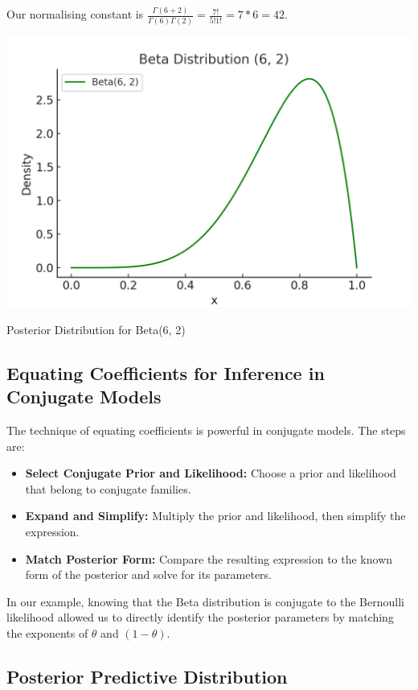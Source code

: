Our normalising constant is $\frac{\Gamma(6+2)}{\Gamma(6)\Gamma(2)} = \frac{7!}{5!1!} = 7*6 = 42$.


\begin{marginfigure}
    \centering
    \includegraphics[width=\linewidth]{img/11_Beta_6_2.png}
    \caption{Posterior Distribution for Beta(6, 2)}
    \label{fig:beta_posterior}
\end{marginfigure}


\subsection{Equating Coefficients for Inference in Conjugate Models}

The technique of equating coefficients is powerful in conjugate models. The steps are:

\begin{itemize}
    \item \textbf{Select Conjugate Prior and Likelihood:} Choose a prior and likelihood that belong to conjugate families.
    \item \textbf{Expand and Simplify:} Multiply the prior and likelihood, then simplify the expression.
    \item \textbf{Match Posterior Form:} Compare the resulting expression to the known form of the posterior and solve for its parameters.
\end{itemize}

In our example, knowing that the Beta distribution is conjugate to the Bernoulli likelihood allowed us to directly identify the posterior parameters by matching the exponents of \( \theta \) and \( (1 - \theta) \).

\subsection{Posterior Predictive Distribution}

